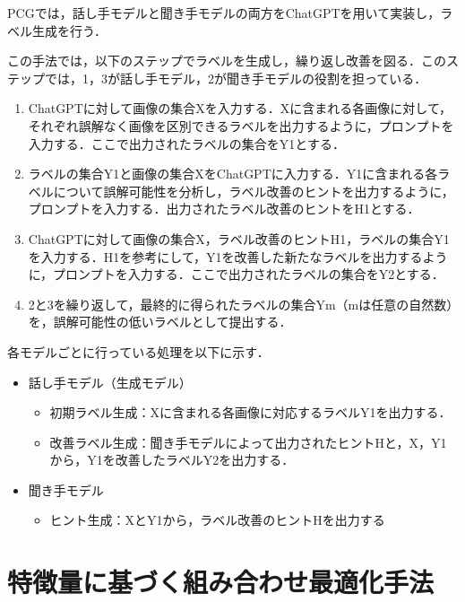 \documentclass[a4paper,11pt]{jreport}
\begin{document}
PCGでは，話し手モデルと聞き手モデルの両方をChatGPTを用いて実装し，ラベル生成を行う．

この手法では，以下のステップでラベルを生成し，繰り返し改善を図る．このステップでは，1，3が話し手モデル，2が聞き手モデルの役割を担っている．

\begin{enumerate}
  \item ChatGPTに対して画像の集合Xを入力する．Xに含まれる各画像に対して，それぞれ誤解なく画像を区別できるラベルを出力するように，プロンプトを入力する．ここで出力されたラベルの集合をY1とする．
  \item ラベルの集合Y1と画像の集合XをChatGPTに入力する．Y1に含まれる各ラベルについて誤解可能性を分析し，ラベル改善のヒントを出力するように，プロンプトを入力する．出力されたラベル改善のヒントをH1とする．
  \item ChatGPTに対して画像の集合X，ラベル改善のヒントH1，ラベルの集合Y1を入力する．H1を参考にして，Y1を改善した新たなラベルを出力するように，プロンプトを入力する．ここで出力されたラベルの集合をY2とする．
  \item 2と3を繰り返して，最終的に得られたラベルの集合Ym（mは任意の自然数）を，誤解可能性の低いラベルとして提出する．
\end{enumerate}

各モデルごとに行っている処理を以下に示す．

\begin{itemize}
  \item 話し手モデル（生成モデル）
    \begin{itemize}
      \item 初期ラベル生成：Xに含まれる各画像に対応するラベルY1を出力する．
      \item 改善ラベル生成：聞き手モデルによって出力されたヒントHと，X，Y1から，Y1を改善したラベルY2を出力する．
    \end{itemize}
  \item 聞き手モデル
    \begin{itemize}
      \item ヒント生成：XとY1から，ラベル改善のヒントHを出力する
    \end{itemize}
\end{itemize}
	

\section{特徴量に基づく組み合わせ最適化手法}
\end{document}

